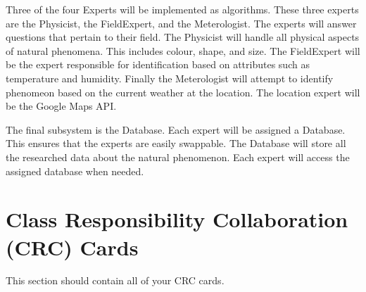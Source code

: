 \documentclass[]{article}
\begin{document}
Three of the four Experts will be implemented as algorithms. These three experts are the Physicist, the FieldExpert, and the Meterologist. The experts will answer questions that pertain to their field. The Physicist will handle all physical aspects of natural phenomena. This includes colour, shape, and size. The FieldExpert will be the expert responsible for identification based on attributes such as temperature and humidity. Finally the Meterologist will attempt to identify phenomeon based on the current weather at the location. The location expert will be the Google Maps API.

The final subsystem is the Database. Each expert will be assigned a Database. This ensures that the experts are easily swappable. The Database will store all the researched data about the natural phenomenon. Each expert will access the assigned database when needed. 

	
\section{Class Responsibility Collaboration (CRC) Cards}
\label{sec:class_responsibility_collaboration_crc_cards}
This section should contain all of your CRC cards.
\end{document}
